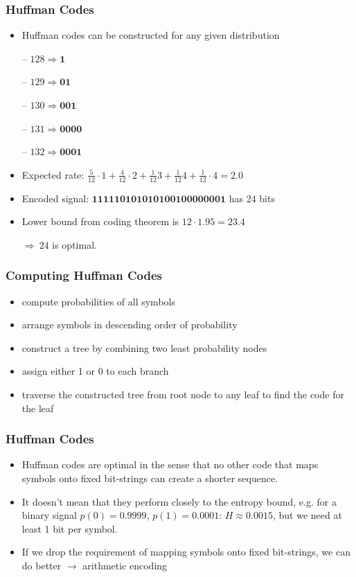 \documentclass{beamer}
\def\ra{$\rightarrow$ }
\begin{document}
\begin{frame}
\frametitle{Huffman Codes}
\begin{itemize}
\item Huffman codes can be constructed for any given distribution

-- $128 \Rightarrow \mathbf{1}$

-- $129 \Rightarrow \mathbf{01}$

-- $130 \Rightarrow \mathbf{001}$

-- $131 \Rightarrow \mathbf{0000}$

-- $132 \Rightarrow \mathbf{0001}$
         
\item Expected rate: $\frac{5}{12}\cdot 1 + \frac{4}{12}\cdot 2 + \frac{1}{12} 3 + \frac{1}{12} 4 + \frac{1}{12} \cdot 4 = 2.0$
\item Encoded signal: $\mathbf{111110101010100100000001}$ has 24 bits
%
\item Lower bound from coding theorem is $12\cdot 1.95 = 23.4$

$\Rightarrow \ 24$ is optimal. 
\end{itemize}
\end{frame}



\begin{frame}
\frametitle{Computing Huffman Codes}
\begin{itemize}
  \item compute probabilities of all symbols
  \item arrange symbols in descending order of probability
  \item construct a tree by combining two least probability nodes
  \item assign either 1 or 0 to each branch
  \item traverse the constructed tree from root node to any leaf to find the
    code for the leaf
\end{itemize}
\end{frame}



\begin{frame}
\frametitle{Huffman Codes}
\begin{itemize}
\item Huffman codes are optimal in the sense that no other code that maps
  symbols onto fixed bit-strings can create a shorter sequence.
\item It doesn't mean that they perform closely to the entropy bound, e.g. for a binary signal 
$p(0)=0.9999$, $p(1)=0.0001$: $H\approx0.0015$, but we need at least 1 bit per symbol.
\item If we drop the requirement of mapping symbols onto fixed bit-strings, we
  can do better \ra arithmetic encoding
\end{itemize}
\end{frame}
\end{document}
